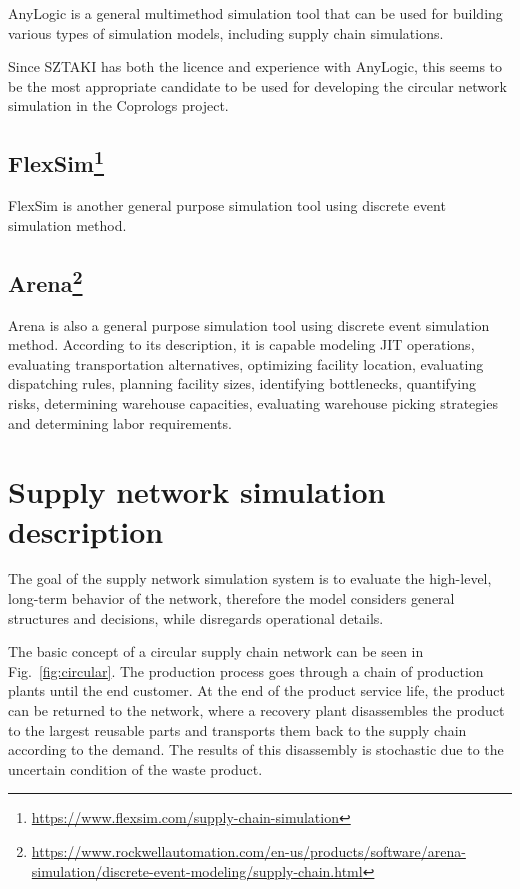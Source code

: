 \documentclass{article}
\begin{document}
AnyLogic is a general multimethod simulation tool that can be used for building various types of simulation models, including supply chain simulations.

Since SZTAKI has both the licence and experience with AnyLogic, this seems to be the most appropriate candidate to be used for developing the circular network simulation in the Coprologs project.


\subsection[FlexSim]{FlexSim\protect\footnote{\href{https://www.flexsim.com/supply-chain-simulation}{https://www.flexsim.com/supply-chain-simulation}}}

FlexSim is another general purpose simulation tool using discrete event simulation method.

\subsection[Arena]{Arena\protect\footnote{\href{https://www.rockwellautomation.com/en-us/products/software/arena-simulation/discrete-event-modeling/supply-chain.html}{https://www.rockwellautomation.com/en-us/products/software/arena-simulation/discrete-event-modeling/supply-chain.html}}}

Arena is also a general purpose simulation tool using discrete event simulation method. According to its description, it is capable modeling JIT operations, evaluating transportation alternatives, optimizing facility location, evaluating dispatching rules, planning facility sizes, identifying bottlenecks, quantifying risks, determining warehouse capacities, evaluating warehouse picking strategies and determining labor requirements.


\section{Supply network simulation description}

The goal of the supply network simulation system is to evaluate the high-level, long-term behavior of the network, therefore the model considers general structures and decisions, while disregards operational details.

The basic concept of a circular supply chain network can be seen in Fig.~\ref{fig:circular}. The production process goes through a chain of production plants until the end customer. At the end of the product service life, the product can be returned to the network, where a recovery plant disassembles the product to the largest reusable parts and transports them back to the supply chain according to the demand. The results of this disassembly is stochastic due to the uncertain condition of the waste product.
\end{document}
